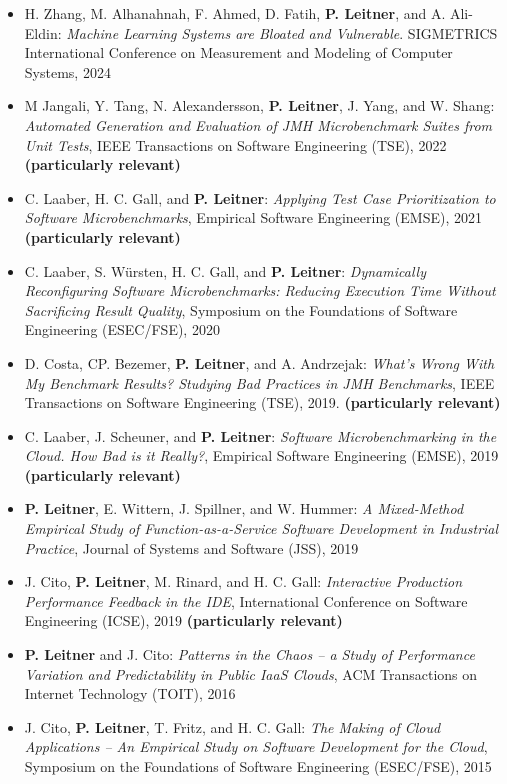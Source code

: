 \documentclass[paper=letter,fontsize=11pt]{scrartcl} %
\begin{document}
\begin{itemize}
	\item H. Zhang, M. Alhanahnah, F. Ahmed, D. Fatih, \textbf{P. Leitner}, and A. Ali-Eldin: 
	\emph{Machine Learning Systems are Bloated and Vulnerable}. SIGMETRICS International Conference on Measurement and Modeling of Computer Systems, 2024
	\item M Jangali, Y. Tang, N. Alexandersson, \textbf{P. Leitner}, J. Yang, and W. Shang: \emph{Automated Generation and Evaluation of JMH Microbenchmark Suites from Unit Tests}, IEEE Transactions on Software Engineering (TSE), 2022 \textbf{(particularly relevant)}
	\item C. Laaber, H. C. Gall, and \textbf{P. Leitner}: \emph{Applying Test Case Prioritization to Software Microbenchmarks}, Empirical Software Engineering (EMSE), 2021 \textbf{(particularly relevant)}
\item C. Laaber,  S. W\"ursten, H. C. Gall, and \textbf{P. Leitner}: \emph{Dynamically Reconfiguring Software Microbenchmarks: Reducing Execution Time Without Sacrificing Result Quality}, Symposium on the Foundations of Software Engineering (ESEC/FSE), 2020 
	\item D. Costa, CP. Bezemer, \textbf{P. Leitner}, and  A. Andrzejak: \emph{What's Wrong With My Benchmark Results? Studying Bad Practices in JMH Benchmarks}, IEEE Transactions on Software Engineering (TSE), 2019. \textbf{(particularly relevant)}
		\item  C. Laaber, J. Scheuner, and \textbf{P. Leitner}: \emph{Software Microbenchmarking in the Cloud. How Bad is it Really?}, Empirical Software Engineering (EMSE), 2019 \textbf{(particularly relevant)}
	\item \textbf{P. Leitner}, E. Wittern, J. Spillner, and W. Hummer: \emph{A Mixed-Method Empirical Study of Function-as-a-Service Software Development in Industrial Practice}, Journal of Systems and Software (JSS), 2019
	\item J. Cito, \textbf{P. Leitner}, M. Rinard, and H. C. Gall: \emph{Interactive Production Performance Feedback in the IDE}, International Conference on Software Engineering (ICSE),  2019 \textbf{(particularly relevant)}
  \item  \textbf{P. Leitner} and J. Cito: \emph{Patterns in the Chaos -- a Study of Performance Variation and Predictability in Public IaaS Clouds}, ACM Transactions on Internet Technology (TOIT), 2016
        \item J. Cito, \textbf{P. Leitner}, T. Fritz, and H. C. Gall: \emph{The Making of Cloud Applications -- An Empirical Study on Software Development for the Cloud}, Symposium on the Foundations of Software Engineering (ESEC/FSE), 2015
\end{itemize}
\end{document}
